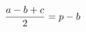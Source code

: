 \documentclass[preview]{standalone}
\begin{document}
\begin{align*}
\special{dvisvgm:raw <g id='unique000'>}\frac{a-b+c}{2}  = p - b\special{dvisvgm:raw </g>}
\end{align*}
\end{document}
